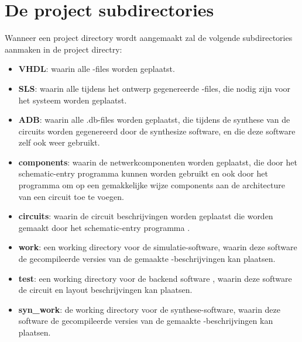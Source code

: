 \section{De project subdirectories}
Wanneer een project directory wordt aangemaakt zal 
de volgende subdirectories aanmaken in de project directry:
\begin{itemize}
\item {\bf VHDL}: waarin alle -files worden geplaatst.
\item {\bf SLS}: waarin alle tijdens het ontwerp gegenereerde -files, die
            nodig zijn voor het  systeem worden geplaatst.
\item {\bf ADB}: waarin alle .db-files worden geplaatst, die tijdens de
            synthese van de circuits worden gegenereerd door de synthesize
            software, en die deze software zelf ook weer gebruikt.
\item {\bf components}: waarin de netwerkcomponenten worden geplaatst, die door
                  het schematic-entry programma kunnen worden gebruikt en ook
                  door het programma  om op een gemak\-kelijke
                  wijze components aan de architecture van een circuit toe
                  te voegen.
\item {\bf circuits}: waarin de circuit beschrijvingen worden geplaatst die worden
                gemaakt door het schematic-entry programma .
\item {\bf work}: een working directory voor de  simulatie-software, waarin
            deze software de gecompileerde versies van de gemaakte
            -beschrijvingen kan plaatsen.
\item {\bf test}: een working directory voor de backend software , waarin
            deze software de circuit en layout beschrijvingen kan plaatsen.
\item {\bf syn\_work}: de working directory voor de synthese-software, waarin
            deze software de gecompileerde versies van de gemaakte
            -beschrijvingen kan plaatsen.
\end{itemize}

